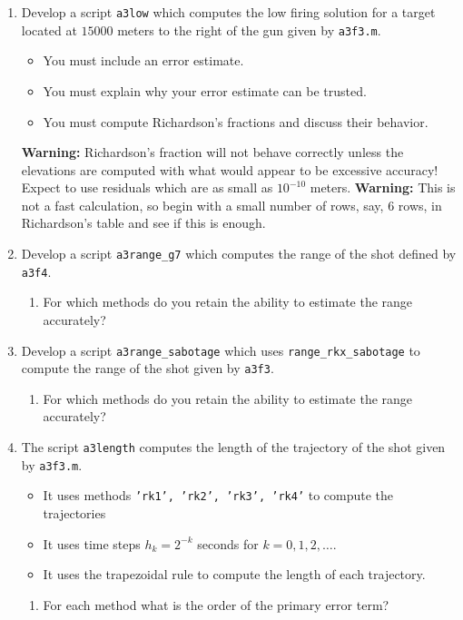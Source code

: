 \documentclass[a4paper,12pt]{article}
\begin{document}
\begin{enumerate}
\item \label{q:elevation} Develop a script {\tt a3low} which computes the low firing solution for a target located at $15000$ meters to the right of the gun given by {\tt a3f3.m}.
  \begin{itemize}
  \item You must include an error estimate.
  \item You must explain why your error estimate can be trusted.
  \item You must compute Richardson's fractions and discuss their behavior.
  \end{itemize}
  {\bf Warning:} Richardson's fraction will not behave correctly unless the elevations are computed with what would appear to be excessive accuracy! Expect to use residuals which are as small as $10^{-10}$ meters.
  {\bf Warning:} This is not a fast calculation, so begin with a small number of rows, say, 6 rows, in Richardson's table and see if this is enough.

\item \label{q:smooth} Develop a script {\tt a3range\_g7} which computes the range of the shot defined by {\tt a3f4}. 
\begin{enumerate}
\item For which methods do you retain the ability to estimate the range accurately?
\end{enumerate}

\item \label{q:sabotage} Develop a script {\tt a3range\_sabotage} which uses {\tt range\_rkx\_sabotage} to compute the range of the shot given by {\tt a3f3}. 
\begin{enumerate}
\item For which methods do you retain the ability to estimate the range accurately?
\end{enumerate}

\item \label{q:length} The script {\tt a3length} computes the length of the trajectory of the shot given by {\tt a3f3.m}.
  \begin{itemize}
  \item It uses methods {\tt 'rk1', 'rk2', 'rk3', 'rk4'} to compute the trajectories
  \item It uses time steps $h_k = 2^{-k}$ seconds for $k=0,1,2,\dotsc$.
  \item It uses the trapezoidal rule to compute the length of each trajectory.
  \end{itemize}
  \begin{enumerate}
  \item For each method what is the order of the primary error term?
  \end{enumerate}
\end{enumerate}
\end{document}
